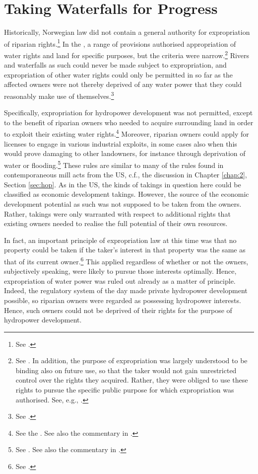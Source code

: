 \section{Taking Waterfalls for Progress}\label{sec:twp}

Historically, Norwegian law did not contain a general authority for expropriation of riparian rights.\footnote{See \cite[29]{amundsen28}.} In the \cite{wra88}, a range of provisions authorised appropriation of water rights and land for specific purposes, but the criteria were narrow.\footnote{See \cite[69-85]{dahl88}. In addition, the purpose of expropriation was largely understood to be binding also on future use, so that the taker would not gain unrestricted control over the rights they acquired. Rather, they were obliged to use these rights to pursue the specific public purpose for which expropriation was authorised. See, e.g., \cite[133-140]{rygh12}.} Rivers and waterfalls as such could never be made subject to expropriation, and expropriation of other water rights could only be permitted in so far as the affected owners were not thereby deprived of any water power that they could reasonably make use of themselves.\footnote{See \cite[58,60]{dahl88}.}

Specifically, expropriation for hydropower development was not permitted, except to the benefit of riparian owners who needed to acquire surrounding land in order to exploit their existing water rights.\footnote{See the \cite[15-16]{wra88}. See also the commentary in \cite[60-65]{dahl88}.} Moreover, riparian owners could apply for licenses to engage in various industrial exploits, in some cases also when this would prove damaging to other landowners, for instance through deprivation of water or flooding.\footnote{See \cite[14]{wra88}. See also the commentary in \cite[54-60]{dahl88}.} These rules are similar to many of the rules found in contemporaneous mill acts from the US, c.f., the discussion in Chapter \ref{chap:2}, Section \ref{sec:hop}. As in the US, the kinds of takings in question here could be classified as economic development takings. However, the source of the economic development potential as such was not supposed to be taken from the owners. Rather, takings were only warranted with respect to additional rights that existing owners needed to realise the full potential of their own resources.

In fact, an important principle of expropriation law at this time was that no property could be taken if the taker's interest in that property was the same as that of its current owner.\footnote{See \cite[168-170]{dahl88}.} This applied regardless of whether or not the owners, subjectively speaking, were likely to pursue those interests optimally. Hence, expropriation of water power was ruled out already as a matter of principle. Indeed, the regulatory system of the day made private hydropower development possible, so riparian owners were regarded as possessing hydropower interests. Hence, such owners could not be deprived of their rights for the purpose of hydropower development.

